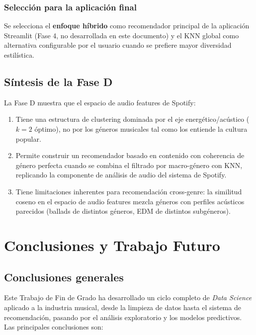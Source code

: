 \documentclass[12pt, a4paper, twoside]{book}
\theoremstyle{definition}
\begin{document}
\subsection{Selección para la aplicación final}

Se selecciona el \textbf{enfoque híbrido} como recomendador principal de la
aplicación Streamlit (Fase 4, no desarrollada en este documento) y el KNN global
como alternativa configurable por el usuario cuando se prefiere mayor diversidad
estilística.

\section{Síntesis de la Fase D}

La Fase D muestra que el espacio de audio features de Spotify:

\begin{enumerate}
  \item Tiene una estructura de clustering dominada por el eje
        energético/acústico ($k = 2$ óptimo), no por los géneros musicales
        tal como los entiende la cultura popular.
  \item Permite construir un recomendador basado en contenido con coherencia de
        género perfecta cuando se combina el filtrado por macro-género con KNN,
        replicando la componente de análisis de audio del sistema de Spotify.
  \item Tiene limitaciones inherentes para recomendación cross-genre: la
        similitud coseno en el espacio de audio features mezcla géneros con
        perfiles acústicos parecidos (ballads de distintos géneros, EDM de
        distintos subgéneros).
\end{enumerate}



\chapter{Conclusiones y Trabajo Futuro}

\section{Conclusiones generales}

Este Trabajo de Fin de Grado ha desarrollado un ciclo completo de \textit{Data
Science} aplicado a la industria musical, desde la limpieza de datos hasta el
sistema de recomendación, pasando por el análisis exploratorio y los modelos
predictivos. Las principales conclusiones son:
\end{document}

